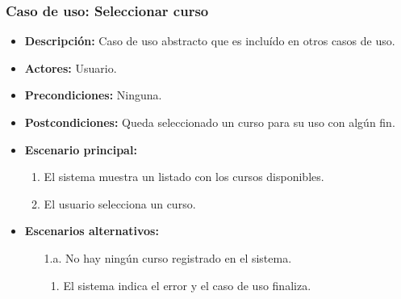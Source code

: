 \subsubsection*{Caso de uso: Seleccionar curso}
\begin{itemize}
\item{\bf Descripción:} Caso de uso abstracto que es incluído en otros casos de uso.
\item{\bf Actores:} Usuario.
\item{\bf Precondiciones:} Ninguna.
\item{\bf Postcondiciones:} Queda seleccionado un curso para su uso con algún fin.
\item{\bf Escenario principal:}
	\begin{enumerate}
	\item El sistema muestra un listado con los cursos disponibles.
        \item El usuario selecciona un curso.
	\end{enumerate}
\item{\bf Escenarios alternativos:}
	\begin{itemize}
	\item[1.a.]No hay ningún curso registrado en el sistema.
	  \begin{enumerate}
	  \item El sistema indica el error y el caso de uso finaliza.
	  \end{enumerate}
	\end{itemize}
\end{itemize}




